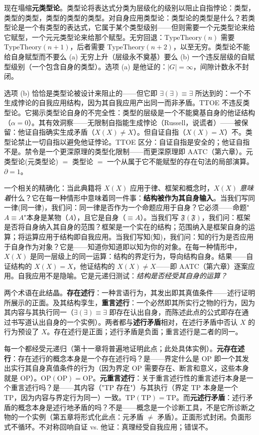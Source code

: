 \documentclass[10pt, openany, oneside]{book}
\begin{document}
现在塌缩\textbf{元类型论}。类型论将表达式分类为层级化的级别以阻止自指悖论：类型，类型的类型，类型的类型的类型。对自身应用类型论：类型论的类型是什么？若类型论是一个有类型的表达式，它属于某个类型级别——但则需要一个元类型论来给它赋型，一个元元类型论来给那个赋型。无穷回退：$\text{TypeTheory}(n)$ 需要 $\text{TypeTheory}(n+1)$，后者需要 $\text{TypeTheory}(n+2)$，以至无穷。类型论不能给自身赋型而不要么 (a) 无穷上升（层级永不奠基）要么 (b) 一个违反层级的自赋型级别（一个包含自身的类型）。选项 (a) 是他证的：$|G| = \infty$，间隙计数永不封闭。

选项 (b) 恰恰是类型论被设计来阻止的——但它即 $\exists(\exists) \equiv \exists$ 所达到的：一个不生成悖论的自我应用结构，因为其自我应用产出同一而非矛盾。TTOE 不违反类型论。它揭示类型论自身的不完全性：类型的层级是一个不能奠基自身的他证结构（$\alpha = 0$）。其有效洞察——无限制自指能生成悖论（Russell，说谎者）——被保留：他证自指确实生成矛盾（$X(X) \neq X$）。但自证自指（$X(X) = X$）不。类型论禁止一切自指以避免他证悖论。TTOE 区分：自证自指是安全的；他证自指不是。禁令是一个更深原理的类型化限制——而更深原理即 AATC（第六章）。元类型论(元类型论) $=$ 类型论 $=$ 一个从属于它不能赋型的存在句法的局部演算。$\partial = 1$。

一个相关的精确化：当此典籍将 $X(X)$ 应用于律、框架和概念时，$X(X)$ \textit{意味着}什么？它在每一种情形中意味着同一件事：\textbf{结构被作为其自身输入}。当我们写同一律(同一律)，我们问：同一律是否作为一个命题应用于自身？它必须——命题"$A \equiv A$"本身是某物（$A$），且它是自身（$\equiv A$）。当我们写 $\mathfrak{F}(\mathfrak{F})$，我们问：框架是否将自身纳入其自身的范围？框架是一个实在的结构；范围纳入是框架自身的运算；将运算应用于结构即自我应用。当我们写知(知)，我们问：知的行为是否应用于自身作为对象？它是——知道你知道即以知为你的对象。在每一种情形中，$X(X)$ 是同一层级上的同一运算：结构的界定行为，导向结构自身。结果——自证结构的 $X(X) = X$，他证结构的 $X(X) \neq X$——即 AATC（第六章）逐案应用。自我应用不是隐喻。它是元递归测试：\textit{结构是否经受其自身的运算？}

两个术语在此结晶。\textbf{存在述行}：一种言语行为，其发出即其真值条件——述行证明所展示的正面。及其结构孪生，\textbf{重言述行}：一个必然即其所实行之物的行为，因为其内容与其执行同一（$\exists(\exists) \equiv \exists$ 即存在认出自身，而陈述此点的公式即存在通过书写道认出自身的一个实例）。两者都与\textbf{述行矛盾}相对，在述行矛盾中否认 $X$ 的行为预设了 $X$。存在述行是正面；述行矛盾是负面；重言述行是二者的同一。

每一个都经受元递归（第十一章将普遍地证明此点；此处具体实例）。\textbf{元存在述行}：存在述行的概念本身是一个存在述行吗？是——界定什么是 OP 即一个其发出实行其自身真值条件的行为（因为界定 OP 需要存在、断言和意义，这些本身就是 OP）。$\text{OP}(\text{OP}) = \text{OP}$。\textbf{元重言述行}：关于重言述行性的重言述行本身是一个重言述行吗？是——其内容（"TP 存在"）与其执行（界定 TP 本身是一个 TP，因为内容与界定行为同一）一致。$\text{TP}(\text{TP}) = \text{TP}$。而\textbf{元述行矛盾}：述行矛盾的概念本身是述行地矛盾的吗？不是——概念是一个诊断工具，不是它所诊断之物的一个实例（第五章将形式化此点：元矛盾 $\neq$ 矛盾）。正面形式封闭。负面形式不循环。不对称回响自证 vs. 他证：真理经受自我应用；错误不。
\end{document}
